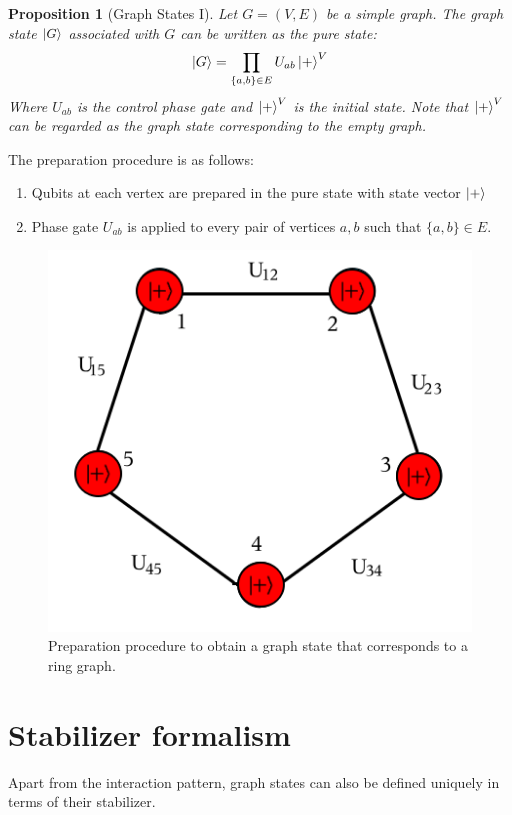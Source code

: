 \documentclass[10pt,a4paper]{book}
\numberwithin{equation}{chapter}
\numberwithin{figure}{chapter}
\numberwithin{table}{chapter}
\newtheorem{prop}{Proposition}[section]
\begin{document}
\begin{prop}[Graph States I]
Let $G=(V,E)$ be a simple graph. The graph state $\ket{G}$ associated with $G$ can be written as the pure state:
\begin{equation}
\ket{G}=\prod_{\lbrace a,b \rbrace \in E} U_{ab} \ket{+}^{V}
\end{equation}
Where $U_{ab}$ is the control phase gate and $\ket{+}^{V}$ is the initial state. Note that $\ket{+}^{V}$ can be regarded as the graph state corresponding to the empty graph.
\end{prop}
The preparation procedure is as follows:
\begin{enumerate}
\item Qubits at each vertex are prepared in the pure state with state vector $\ket{+}$
\item Phase gate $U_{ab}$ is applied to every pair of vertices $a,b$ such that $\lbrace a,b \rbrace \in E$.
\end{enumerate}

\begin{figure}[H]
    \begin{center}
        \includegraphics[scale=0.5]{graphstate1.png}
    \end{center}
    \caption{\footnotesize Preparation procedure to obtain a graph state that corresponds to a ring graph.}
    \label{gs1}
\end{figure}


\section{Stabilizer formalism}\label{sec:Stabilizer}
Apart from the interaction pattern, graph states can also be defined uniquely in terms of their stabilizer.
\end{document}
